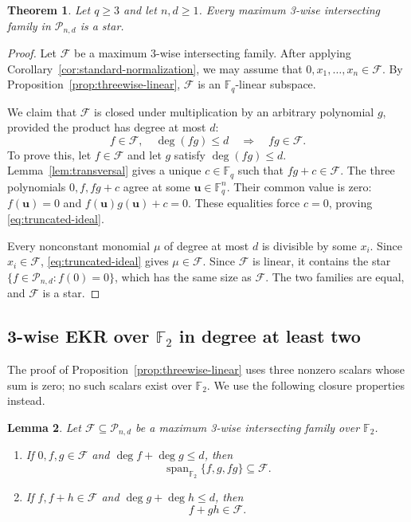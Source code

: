 \documentclass[12pt,reqno]{amsart}
\newtheorem{thm}{Theorem}[section]
\newtheorem{lem}[thm]{Lemma}
\theoremstyle{definition}
\newcommand{\F}{\mathbb{F}}
\newcommand{\cF}{\mathcal F}
\newcommand{\cP}{\mathcal P}
\newcommand{\Span}{\operatorname{span}}
\begin{document}
\begin{thm}
\label{thm:threewise-qge3}
Let $q\geq3$ and let $n,d\geq1$. Every maximum 3-wise intersecting
family in $\cP_{n,d}$ is a star.
\end{thm}

\begin{proof}
Let $\cF$ be a maximum 3-wise intersecting family. After applying
Corollary~\ref{cor:standard-normalization}, we may assume that
$0,x_1,\ldots,x_n\in\cF$. By Proposition~\ref{prop:threewise-linear}, $\cF$ is an
$\F_q$-linear subspace.

We claim that $\cF$ is closed under multiplication by an arbitrary
polynomial $g$, provided the product has degree at most $d$:
\begin{equation}\label{eq:truncated-ideal}
  f\in\cF,\quad \deg(fg)\leq d
  \quad\Longrightarrow\quad fg\in\cF.
\end{equation}
To prove this, let $f\in\cF$ and let $g$ satisfy $\deg(fg)\leq d$.
Lemma~\ref{lem:transversal} gives a unique $c\in\F_q$ such that
$fg+c\in\cF$. The three polynomials $0,f,fg+c$ agree at some
$\mathbf u\in\F_q^n$. Their common value is zero:
$f(\mathbf u)=0$ and $f(\mathbf u)g(\mathbf u)+c=0$. These equalities
force $c=0$, proving \eqref{eq:truncated-ideal}.

Every nonconstant monomial $\mu$ of degree at most $d$ is divisible
by some $x_i$. Since $x_i\in\cF$, \eqref{eq:truncated-ideal} gives
$\mu\in\cF$. Since $\cF$ is linear, it contains the star $\{f\in\cP_{n,d}:f(0)=0\}$,
which has the same size as $\cF$. The two families are equal, and $\cF$ is a star.
\end{proof}

\subsection{3-wise EKR over \texorpdfstring{$\F_2$}{F2} in degree at least two}
\label{subsec:threewise-F2}

The proof of Proposition~\ref{prop:threewise-linear} uses three nonzero scalars whose sum is zero; no such scalars exist over $\F_2$. We use the following closure properties instead.

\begin{lem}\label{lem:F2-boolean-closure}
Let $\cF\subseteq\cP_{n,d}$ be a maximum 3-wise intersecting family
over $\F_2$.
\begin{enumerate}[(1)]
\item If $0,f,g\in\cF$ and $\deg f+\deg g\leq d$, then
\[
  \Span_{\F_2}\{f,g,fg\}\subseteq\cF.
\]
\item If $f,f+h\in\cF$ and $\deg g+\deg h\leq d$, then
\[
  f+gh\in\cF.
\]
\end{enumerate}
\end{lem}
\end{document}

